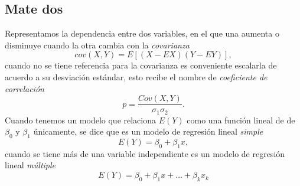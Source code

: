 \subsection{Mate dos}
Representamos la dependencia entre dos variables, en el que una aumenta o disminuye cuando la otra cambia con la \emph{covarianza}
\begin{equation}
cov(X,Y)=E[(X-EX)(Y-EY)],
\end{equation}
cuando no se tiene referencia para la covarianza es conveniente escalarla de acuerdo a su desviación estándar, esto recibe el nombre de  \emph{coeficiente de correlación}
\begin{equation}
p=\frac{Cov(X,Y)}{\sigma_1\sigma_2}.
\end{equation}
Cuando tenemos un modelo que relaciona $E(Y)$ como una función lineal de de $\beta_0$ y $\beta_1$ únicamente, se dice que es un modelo de regresión lineal \emph{simple}
\begin{equation}
E(Y)=\beta_0+\beta_1x,
\end{equation}
cuando se tiene más de una variable independiente es un modelo de regresión lineal \emph{ múltiple}
\begin{equation}
E(Y)=\beta_0+\beta_1x+\ldots+\beta_kx_k
\end{equation}